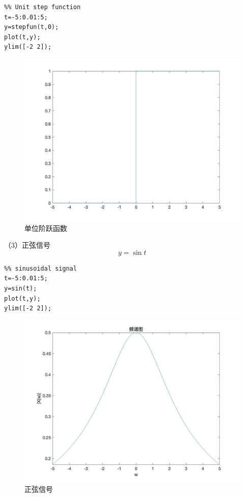 \documentclass[a4paper,12pt]{ctexart}
\begin{document}
\begin{lstlisting}
%% Unit step function
t=-5:0.01:5;
y=stepfun(t,0);
plot(t,y);
ylim([-2 2]);
\end{lstlisting}
\begin{figure}[H]
    \centering
    \includegraphics[width=14cm]{2.jpg}
    \caption{单位阶跃函数}
\end{figure}

（3）正弦信号
\begin{equation}
    y=\sin{t}
\end{equation}

\begin{lstlisting}
%% sinusoidal signal
t=-5:0.01:5;
y=sin(t);
plot(t,y);
ylim([-2 2]);
\end{lstlisting}
\begin{figure}[H]
    \centering
    \includegraphics[width=14cm]{3.jpg}
    \caption{正弦信号}
\end{figure}
\end{document}
